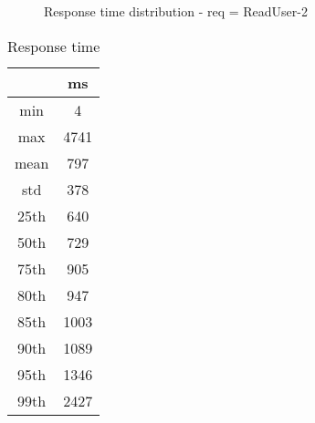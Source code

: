 \begin{minipage}{0.75\linewidth}
\begin{figure}[h]
\begin{adjustbox}{max width=1.0\linewidth, keepaspectratio}
  \end{adjustbox}
  \caption{Response time distribution - req = ReadUser-2}
\end{figure}
\end{minipage}\hfill\begin{minipage}{0.18\linewidth}
\begin{table}[h]
\begin{tabular}{|cc|}
\hline
\textbf{} & \textbf{ms}\\ \hline
 \Xhline{0.005\arrayrulewidth}
min & 4\\
 \Xhline{0.005\arrayrulewidth}
max & 4741\\
 \Xhline{0.005\arrayrulewidth}
mean & 797\\
 \Xhline{0.005\arrayrulewidth}
std & 378\\
\hline
\hline
 \Xhline{0.005\arrayrulewidth}
25th & 640\\
 \Xhline{0.005\arrayrulewidth}
50th & 729\\
 \Xhline{0.005\arrayrulewidth}
75th & 905\\
 \Xhline{0.005\arrayrulewidth}
80th & 947\\
 \Xhline{0.005\arrayrulewidth}
85th & 1003\\
 \Xhline{0.005\arrayrulewidth}
90th & 1089\\
 \Xhline{0.005\arrayrulewidth}
95th & 1346\\
 \Xhline{0.005\arrayrulewidth}
99th & 2427\\
\hline
\end{tabular}
\caption{Response time}
\end{table}
\end{minipage}\hfill